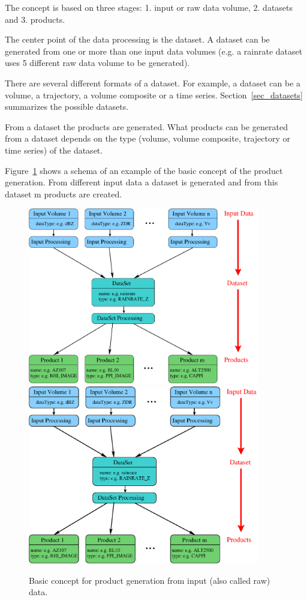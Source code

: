 \documentclass[a4paper,11pt,pdftex,twoside]{scrartcl}
\begin{document}
{{{The concept is based on three stages: 1. input or raw data volume, 2. datasets
and 3. products.

The center point of the data processing is the dataset. A dataset can be
generated from one or more than one input data volumes (e.g. a rainrate dataset
uses 5 different raw data volume to be generated).

There are several different formats of a dataset. For example, a dataset can be a
volume, a trajectory, a volume composite or a time series.
Section~\ref{sec_datasets} summarizes the possible datasets.

From a dataset the products are generated. What products can be generated from
a dataset depends on the type (volume, volume composite, trajectory or
time series) of the dataset.

Figure~\ref{fig_main_concept} shows a schema of an example of the basic concept
of the product generation. From different input data a dataset
is generated and from this dataset m products are created.

\begin{figure}[htbp]
  \begin{center}
    \ifpdf
      \includegraphics[width=0.9\textwidth]{./figures/main_concept.pdf}
    \else
      \includegraphics[width=0.9\textwidth]{./figures/main_concept.eps}
    \fi
  \end{center}
  \caption{Basic concept for product generation from input (also called raw) data.}
  \label{fig_main_concept}
\end{figure}

}}}
\end{document}
